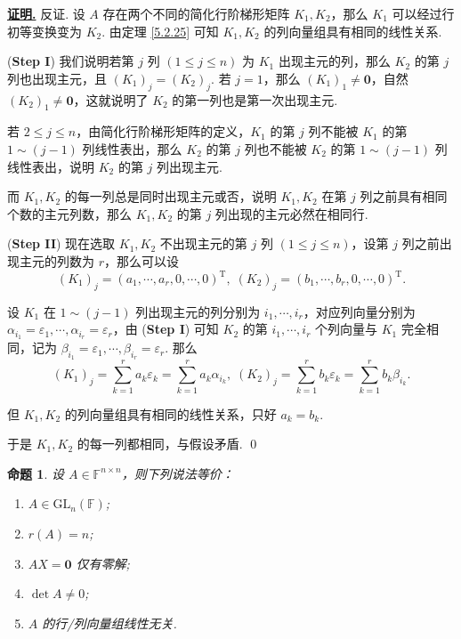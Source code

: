 \documentclass[10pt,openany]{article}
\theoremstyle{thmstyle} %
\theoremstyle{defstyle} %
\theoremstyle{prostyle} %
\newtheorem{proposition}[theorem]{命题}
\theoremstyle{exastyle}
\theoremstyle{remstyle}
\renewenvironment{proof}[1][证明]{\par\underline{\textbf{#1.}} \;\fangsong}{\qed\par}
\newcommand{\T}{^{\text{T}}}
\newcommand{\F}{\mathbb{F}}
\newcommand{\gfn}{\text{GL}_n(\mathbb{F})}
\newcommand{\n}{^{n \times n}}
\begin{document}
\begin{proof}
	反证. 设 \( A \) 存在两个不同的简化行阶梯形矩阵 \( K_1,K_2 \)，那么 \( K_1 \) 可以经过行初等变换变为 \( K_2 \). 由定理 \ref{5.2.25} 可知 \( K_1,K_2 \) 的列向量组具有相同的线性关系. 
	
	(\textbf{Step I}) \; 我们说明若第 \( j \) 列 \( (1 \leq j \leq n) \) 为 \( K_1 \) 出现主元的列，那么 \( K_2 \) 的第 \( j \) 列也出现主元，且 \( (K_1)_j=(K_2)_j \). 若 \( j=1 \)，那么 \( (K_1)_1 \neq \bm{0} \)，自然 \( (K_2)_1 \neq \bm{0} \)，这就说明了 \( K_2 \) 的第一列也是第一次出现主元.
	
	若 \( 2 \leq j \leq n \)，由简化行阶梯形矩阵的定义，\( K_1 \) 的第 \( j \) 列不能被 \( K_1 \) 的第 \( 1 \sim (j-1) \) 列线性表出，那么 \( K_2 \) 的第 \( j \) 列也不能被 \( K_2 \) 的第 \( 1 \sim (j-1) \) 列线性表出，说明 \( K_2 \) 的第 \( j \) 列出现主元.
	
	而 \( K_1,K_2 \) 的每一列总是同时出现主元或否，说明 \( K_1,K_2 \) 在第 \( j \) 列之前具有相同个数的主元列数，那么 \( K_1,K_2 \) 的第 \( j \) 列出现的主元必然在相同行.
	
	(\textbf{Step II}) \; 现在选取 \( K_1,K_2 \) 不出现主元的第 \( j \) 列 \( (1 \leq j \leq n) \)，设第 \( j \) 列之前出现主元的列数为 \( r \)，那么可以设
	\[ (K_1)_j=(a_1,\cdots,a_r,0,\cdots,0)\T, \; (K_2)_j=(b_1,\cdots,b_r,0,\cdots,0)\T. \]
	
	设 \( K_1 \) 在 \( 1 \sim (j-1) \) 列出现主元的列分别为 \( i_1,\cdots,i_r \)，对应列向量分别为 \( \alpha_{i_1}=\varepsilon_1,\cdots,\alpha_{i_r}=\varepsilon_r \)，由 (\textbf{Step I}) 可知 \( K_2 \) 的第 \( i_1,\cdots,i_r \) 个列向量与 \( K_1 \) 完全相同，记为 \( \beta_{i_1}=\varepsilon_1,\cdots,\beta_{i_r}=\varepsilon_r \). 那么
	\[ (K_1)_j=\sum_{k=1}^{r} a_k\varepsilon_k= \sum_{k=1}^{r} a_k\alpha_{i_k},  \; (K_2)_j=\sum_{k=1}^{r} b_k\varepsilon_k= \sum_{k=1}^{r} b_k\beta_{i_k}. \]
	
	但 \( K_1,K_2 \) 的列向量组具有相同的线性关系，只好 \( a_k=b_k \).
	
	于是 \( K_1,K_2 \) 的每一列都相同，与假设矛盾.
\end{proof}

\begin{proposition} \label{5.2.28}
	设 \( A \in \F\n \)，则下列说法等价：
	\begin{enumerate}[(1)]
		\item \( A \in \gfn  \);
		\item \( r(A)=n \);
		\item \( AX=\bm{0} \) 仅有零解;
		\item \( \det A \neq 0 \);
		\item \( A \) 的行/列向量组线性无关.
	\end{enumerate}
\end{proposition}
\end{document}
